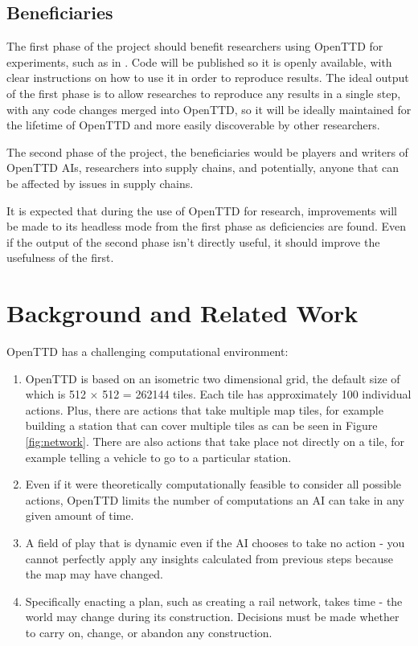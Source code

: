 \documentclass[a4paper,11pt]{article}
\begin{document}
\subsection{Beneficiaries}

The first phase of the project should benefit researchers using OpenTTD for experiments, such as in \cite{rios_trains_2009, wisniewski_artificial, shen_rtsenv_2011}. Code will be published so it is openly available, with clear instructions on how to use it in order to reproduce results. The ideal output of the first phase is to allow researches to reproduce any results in a single step, with any code changes merged into OpenTTD, so it will be ideally maintained for the lifetime of OpenTTD and more easily discoverable by other researchers.

The second phase of the project, the beneficiaries would be players and writers of OpenTTD AIs, researchers into supply chains, and potentially, anyone that can be affected by issues in supply chains.

It is expected that during the use of OpenTTD for research, improvements will be made to its headless mode from the first phase as deficiencies are found. Even if the output of the second phase isn't directly useful, it should improve the usefulness of the first.

\section{Background and Related Work}

OpenTTD has a challenging computational environment:

\begin{enumerate}

\item OpenTTD is based on an isometric two dimensional grid, the default size of which is 512 $\times$ 512 = 262144 tiles. Each tile has approximately 100 individual actions. Plus, there are actions that take multiple map tiles, for example building a station that can cover multiple tiles as can be seen in Figure \ref{fig:network}. There are also actions that take place not directly on a tile, for example telling a vehicle to go to a particular station.

\item Even if it were theoretically computationally feasible to consider all possible actions, OpenTTD limits the number of computations an AI can take in any given amount of time.

\item A field of play that is dynamic even if the AI chooses to take no action - you cannot perfectly apply any insights calculated from previous steps because the map may have changed.

\item Specifically enacting a plan, such as creating a rail network, takes time - the world may change during its construction. Decisions must be made whether to carry on, change, or abandon any construction.

\end{enumerate}
\end{document}
